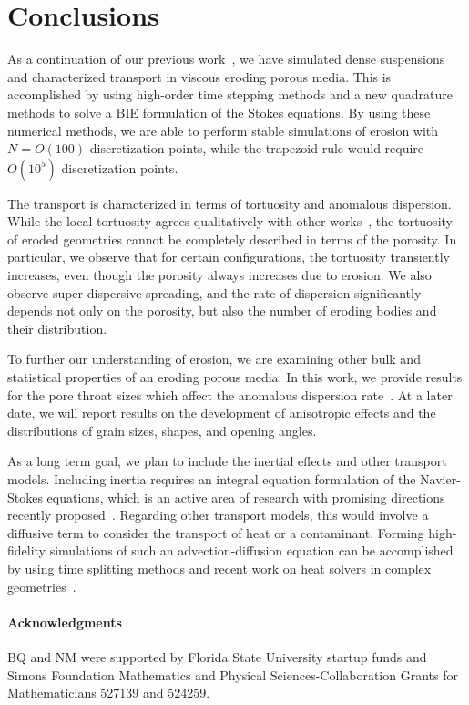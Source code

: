 \documentclass{jfm}
\begin{document}
\section{Conclusions}
\label{sec:conclusions}
As a continuation of our previous work~\citep{qua-moo2018}, we have
simulated dense suspensions and characterized transport in viscous
eroding porous media. This is accomplished by using high-order time
stepping methods and a new quadrature methods to solve a BIE formulation
of the Stokes equations.  By using these numerical methods, we are able
to perform stable simulations of erosion with $N = O(100)$
discretization points, while the trapezoid rule would require $O(10^5)$
discretization points.

The transport is characterized in terms of tortuosity and anomalous
dispersion. While the local tortuosity agrees qualitatively with other
works~\citep{mat-kha-koz2008}, the tortuosity of eroded geometries
cannot be completely described in terms of the porosity. In particular,
we observe that for certain configurations, the tortuosity transiently
increases, even though the porosity always increases due to erosion. We
also observe super-dispersive spreading, and the rate of dispersion
significantly depends not only on the porosity, but also the number of
eroding bodies and their distribution.

To further our understanding of erosion, we are examining other bulk and
statistical properties of an eroding porous media. In this work, we
provide results for the pore throat sizes which affect the anomalous
dispersion rate~\citep{dea-qua-bir-jua2018}.  At a later date, we will
report results on the  development of anisotropic effects and the
distributions of grain sizes, shapes, and opening angles.

As a long term goal, we plan to include the inertial effects and other
transport models. Including inertia requires an integral equation
formulation of the Navier-Stokes equations, which is an active area of
research with promising directions recently
proposed~\citep{gray2019boundary, kli-ask-kro2019}.  Regarding other
transport models, this would involve a diffusive term to consider the
transport of heat or a contaminant. Forming high-fidelity simulations of
such an advection-diffusion equation can be accomplished by using time
splitting methods and recent work on heat solvers in complex
geometries~\citep{fry-kro-tor2019}.


\paragraph{\bf Acknowledgments} BQ and NM were supported by Florida
State University startup funds and Simons Foundation Mathematics and
Physical Sciences-Collaboration Grants for Mathematicians 527139 and
524259.

 

\end{document}
